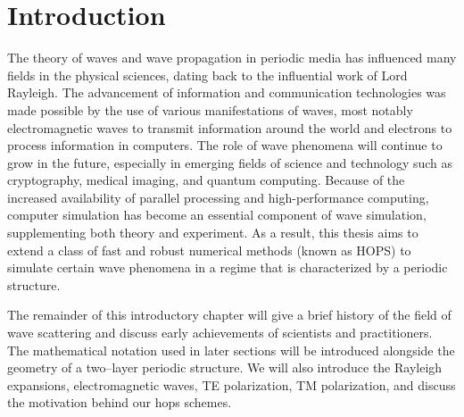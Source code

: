 \chapter{Introduction}
\label{sec:intro}

\pagestyle{fancy}
\renewcommand{\sectionmark}[1]{\markright{\thesection\quad \ #1}}
\fancyhead{}
\fancyhead[LE,RO]{\thepage}
\fancyhead[RE]{\sectionmark \quad \rightmark } %
\fancyfoot[L,R,C]{}
\renewcommand{\headrulewidth}{1pt}%

The theory of waves and wave propagation in periodic media has influenced many fields in the physical sciences, dating back to the influential work of Lord Rayleigh. The advancement of information and communication technologies was made possible by the use of various manifestations of waves, most notably electromagnetic waves to transmit information around the world and electrons to process information in computers. The role of wave phenomena will continue to grow in the future, especially in emerging fields of science and technology such as cryptography, medical imaging, and quantum computing. Because of the increased availability of parallel processing and high-performance computing, computer simulation has become an essential component of wave simulation, supplementing both theory and experiment. As a result, this thesis aims to extend a class of fast and robust numerical methods (known as HOPS) to simulate certain wave phenomena in a regime that is characterized by a periodic structure.

The remainder of this introductory chapter will give a brief history of the field of wave scattering and discuss early achievements of scientists and practitioners. The mathematical notation used in later sections will be introduced alongside the geometry of a two--layer periodic structure. We will also introduce the Rayleigh expansions, electromagnetic waves, TE polarization, TM polarization, and discuss the motivation behind our \gls{hops} schemes.








%

%
%
